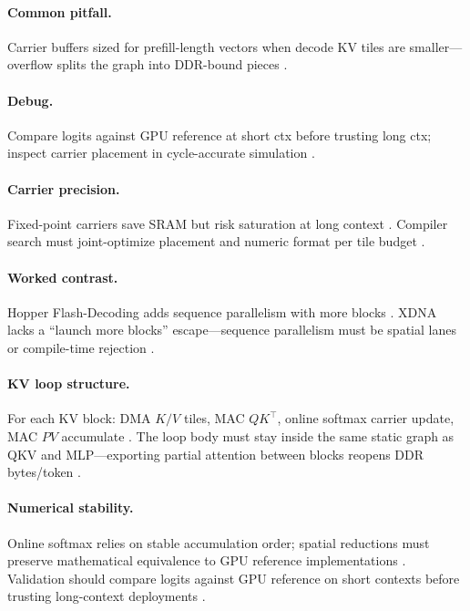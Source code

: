 \paragraph{Common pitfall.}
Carrier buffers sized for prefill-length vectors when decode KV tiles are smaller---overflow splits the graph into DDR-bound pieces \citep{dao2023flashdecoding,memoryfloor2026}.

\paragraph{Debug.}
Compare logits against GPU reference at short ctx before trusting long ctx; inspect carrier placement in cycle-accurate simulation \citep{amd2024aie,yirage2026}.

\paragraph{Carrier precision.}
Fixed-point carriers save SRAM but risk saturation at long context \citep{dao2022flashattention}.
Compiler search must joint-optimize placement and numeric format per tile budget \citep{yirage2026,patel2025llminference}.

\paragraph{Worked contrast.}
Hopper Flash-Decoding adds sequence parallelism with more blocks \citep{dao2023flashdecoding}.
XDNA lacks a ``launch more blocks'' escape---sequence parallelism must be spatial lanes or compile-time rejection \citep{amd2024xdna,yirage2026}.

\paragraph{KV loop structure.}
For each KV block: DMA $K/V$ tiles, MAC $QK^\top$, online softmax carrier update, MAC $PV$ accumulate \citep{dao2022flashattention,semianalysis2024tma,dao2023flashdecoding}.
The loop body must stay inside the same static graph as QKV and MLP---exporting partial attention between blocks reopens DDR bytes/token \citep{memoryfloor2026,yirage2026,taxbreak2026}.

\paragraph{Numerical stability.}
Online softmax relies on stable accumulation order; spatial reductions must preserve mathematical equivalence to GPU reference implementations \citep{dao2022flashattention,dao2023flashdecoding}.
Validation should compare logits against GPU reference on short contexts before trusting long-context deployments \citep{memoryfloor2026,amd2024aie}.


